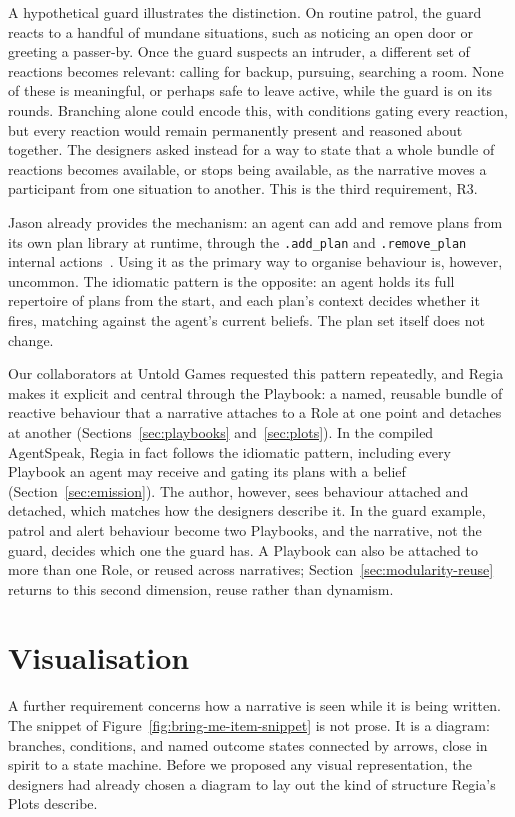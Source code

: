 A hypothetical guard illustrates the distinction. On routine patrol, the guard reacts to a handful of mundane situations, such as noticing an open door or greeting a passer-by. Once the guard suspects an intruder, a different set of reactions becomes relevant: calling for backup, pursuing, searching a room. None of these is meaningful, or perhaps safe to leave active, while the guard is on its rounds. Branching alone could encode this, with conditions gating every reaction, but every reaction would remain permanently present and reasoned about together. The designers asked instead for a way to state that a whole bundle of reactions becomes available, or stops being available, as the narrative moves a participant from one situation to another. This is the third requirement, R3.
 
Jason already provides the mechanism: an agent can add and remove plans from its own plan library at runtime, through the \lstinline|.add_plan| and \lstinline|.remove_plan| internal actions~\cite{Bordini2007}. Using it as the primary way to organise behaviour is, however, uncommon. The idiomatic pattern is the opposite: an agent holds its full repertoire of plans from the start, and each plan's context decides whether it fires, matching against the agent's current beliefs. The plan set itself does not change.
 
Our collaborators at Untold Games requested this pattern repeatedly, and Regia makes it explicit and central through the Playbook: a named, reusable bundle of reactive behaviour that a narrative attaches to a Role at one point and detaches at another (Sections~\ref{sec:playbooks} and~\ref{sec:plots}). In the compiled AgentSpeak, Regia in fact follows the idiomatic pattern, including every Playbook an agent may receive and gating its plans with a belief (Section~\ref{sec:emission}). The author, however, sees behaviour attached and detached, which matches how the designers describe it. In the guard example, patrol and alert behaviour become two Playbooks, and the narrative, not the guard, decides which one the guard has. A Playbook can also be attached to more than one Role, or reused across narratives; Section~\ref{sec:modularity-reuse} returns to this second dimension, reuse rather than dynamism.


\section{Visualisation}
\label{sec:visualization}
A further requirement concerns how a narrative is seen while it is being written. The snippet of Figure~\ref{fig:bring-me-item-snippet} is not prose. It is a diagram: branches, conditions, and named outcome states connected by arrows, close in spirit to a state machine. Before we proposed any visual representation, the designers had already chosen a diagram to lay out the kind of structure Regia's Plots describe.
 
